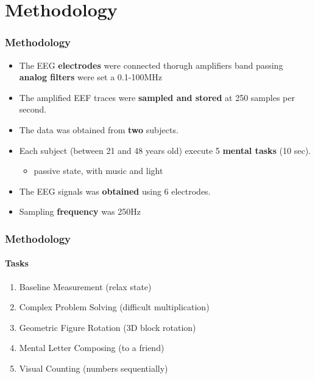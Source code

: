\section{Methodology}
\frame
{
\frametitle{Methodology}
\begin{itemize}
	\item The EEG \textbf{electrodes} were connected thorugh amplifiers band passing \textbf{analog filters} were set a 0.1-100MHz
	\item The amplified EEF traces were \textbf{sampled and stored} at 250 samples per second.
	\item The data was obtained from \textbf{two} subjects.
	\item Each subject (between 21 and 48 years old) execute 5 \textbf{mental tasks} (10 sec).
	\begin{itemize}
		\item passive state, with music and light
	\end{itemize}
	\item The EEG signals was \textbf{obtained} using 6 electrodes.
	\item Sampling \textbf{frequency} was 250Hz
\end{itemize}
}

\frame
{
\frametitle{Methodology}
\framesubtitle{Tasks}
\begin{enumerate}
	\item Baseline Measurement (relax state)
	\item Complex Problem Solving (difficult multiplication)
	\item Geometric Figure Rotation (3D block rotation)
	\item Mental Letter Composing (to a friend)
	\item Visual Counting (numbers sequentially)
\end{enumerate}
}

